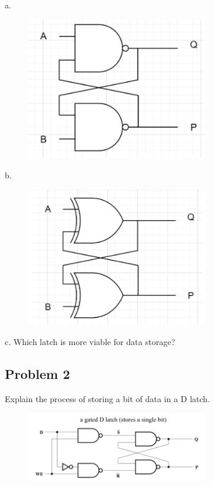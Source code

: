 \documentclass{article}
\begin{document}
a.
    \begin{figure}[!h]
        \centering
        \includegraphics[width=0.7\textwidth]{figures/latch1a.png}
    \end{figure}

b.
    \begin{figure}[!h]
        \centering
        \includegraphics[width=0.7\textwidth]{figures/latch1b.png}
    \end{figure}

c. Which latch is more viable for data storage?

\subsection*{Problem 2}
Explain the process of storing a bit of data in a D latch.
\begin{figure}[!h]
    \centering
    \includegraphics[width=0.7\textwidth]{figures/latch2.png}
\end{figure}
\end{document}
